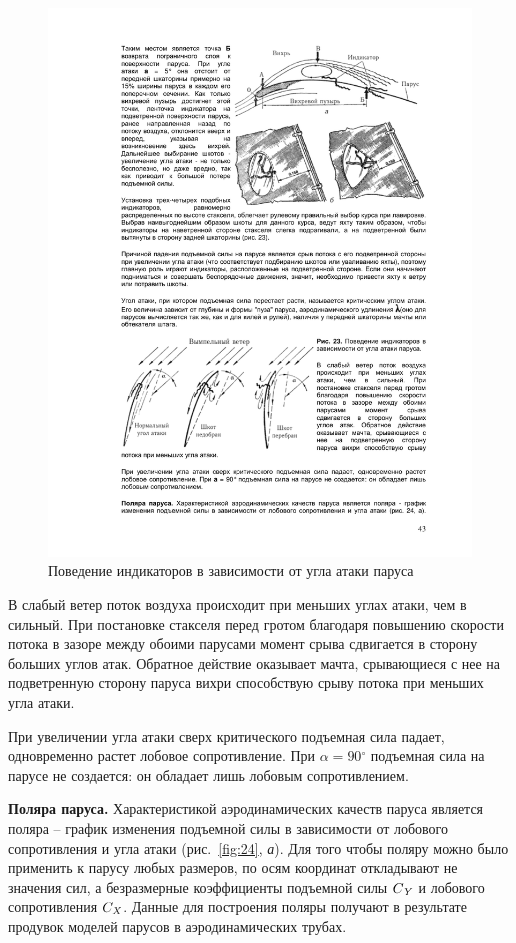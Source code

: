 \documentclass[a4paper, 12pt, twoside, final, book, russian, fittopage, cyremdash]{ncc}
\newcommand{\cidx}[2]{\ensuremath{#1_{\text{\textit{#2}}}}}
\newcommand{\gr}{\ensuremath{^\circ}\xspace}
\newcommand{\ris}[1]{\ref{fig:#1}}
\begin{document}
\begin{figure}[htb]
  \centering
  \includegraphics[scale=1]{0023}
  \caption{Поведение индикаторов в зависимости от угла атаки паруса}
  \label{fig:23}
\end{figure}

В слабый ветер поток воздуха происходит при меньших углах атаки, чем в сильный. При постановке стакселя перед гротом благодаря повышению скорости потока в зазоре между обоими парусами момент срыва сдвигается в сторону больших углов атак. Обратное действие оказывает мачта, срывающиеся с нее на подветренную сторону паруса вихри способствую срыву потока при меньших угла атаки. 

При увеличении угла атаки сверх критического подъемная сила падает, одновременно растет лобовое сопротивление. При $\alpha = 90\gr$ подъемная сила на парусе не создается: он обладает лишь лобовым сопротивлением.

\textbf{Поляра паруса.} Характеристикой аэродинамических качеств паруса является поляра \--- график изменения подъемной силы в зависимости от лобового сопротивления и угла атаки (рис.~\ris{24}, \textit{а}). Для того чтобы поляру можно было применить к парусу любых размеров, по осям координат откладывают не значения сил, а безразмерные коэффициенты подъемной силы \cidx{C}{Y} и лобового сопротивления \cidx{C}{X}. Данные для построения поляры получают в результате продувок моделей парусов в аэродинамических трубах. 
\end{document}

